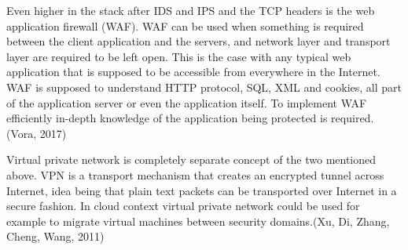 \documentclass{article}
\begin{document}
\par
Even higher in the stack after IDS and IPS and the TCP headers is the web application firewall (WAF). WAF can be used when something is required between the client application and the servers, and network layer and transport layer are required to be left open. This is the case with any typical web application that is supposed to be accessible from everywhere in the Internet. WAF is supposed to understand HTTP protocol, SQL, XML and cookies, all part of the application server or even the application itself. To implement WAF efficiently in-depth knowledge of the application being protected is required.(Vora, 2017)
\par
Virtual private network is completely separate concept of the two mentioned above. VPN is a transport mechanism that creates an encrypted tunnel across Internet, idea being that plain text packets can be transported over Internet in a secure fashion. In cloud context virtual private network could be used for example to migrate virtual machines between security domains.(Xu, Di, Zhang, Cheng, Wang, 2011)
\par
\end{document}

